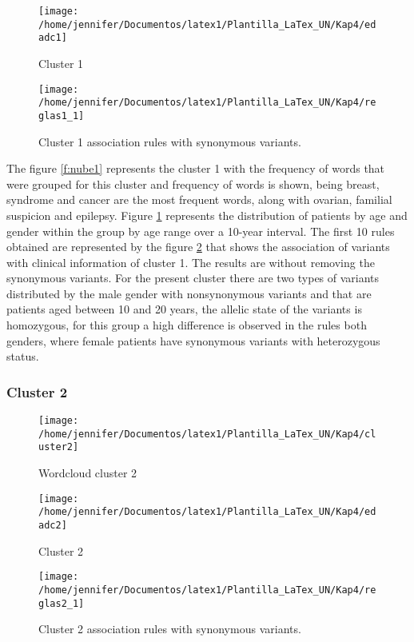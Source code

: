 \documentclass[twocolumn]{bmcart}%
\begin{document}
\begin{figure}[h!] 
	\centering
	\texttt{[image: /home/jennifer/Documentos/latex1/Plantilla\_LaTex\_UN/Kap4/edadc1]}
	\caption{Cluster 1} 
	\label{fig:cluster1}
\end{figure}


\begin{figure}[h!]
	\centering
	\texttt{[image: /home/jennifer/Documentos/latex1/Plantilla\_LaTex\_UN/Kap4/reglas1\_1]}
	\caption{Cluster 1 association rules with synonymous variants.} \label{fig:reglas1}
\end{figure}

The figure 	\ref{f:nube1} represents the cluster 1 with the frequency of words that were grouped for this cluster and frequency of words is shown, being breast, syndrome and cancer are the most frequent words, along with ovarian, familial suspicion and epilepsy. Figure \ref {fig:cluster1} represents the distribution of patients by age and gender within the group by age range over a 10-year interval. The first 10 rules obtained are represented by the figure \ref{fig:reglas1} that shows the association of variants with clinical information of cluster 1. The results are without removing the synonymous variants. For the present cluster there are two types of variants distributed by the male gender with nonsynonymous variants and that are patients aged between 10 and 20 years, the allelic state of the variants is homozygous, for this group a high difference is observed in the rules both genders, where female patients have synonymous variants with heterozygous status.

\subsubsection*{Cluster 2}

\begin{figure}[h!] 
	\centering
	\texttt{[image: /home/jennifer/Documentos/latex1/Plantilla\_LaTex\_UN/Kap4/cluster2]}
	\caption{Wordcloud cluster 2} 
	\label{f:nube2}
\end{figure}

\begin{figure}[h!] 
	\centering
	\texttt{[image: /home/jennifer/Documentos/latex1/Plantilla\_LaTex\_UN/Kap4/edadc2]}
	\caption{Cluster 2} 
	\label{fig:cluster2}
\end{figure}

\begin{figure}[h!]
	\centering
	\texttt{[image: /home/jennifer/Documentos/latex1/Plantilla\_LaTex\_UN/Kap4/reglas2\_1]}
	\caption{Cluster 2 association rules with synonymous variants.} \label{fig:reglas2}
\end{figure}
\end{document}
